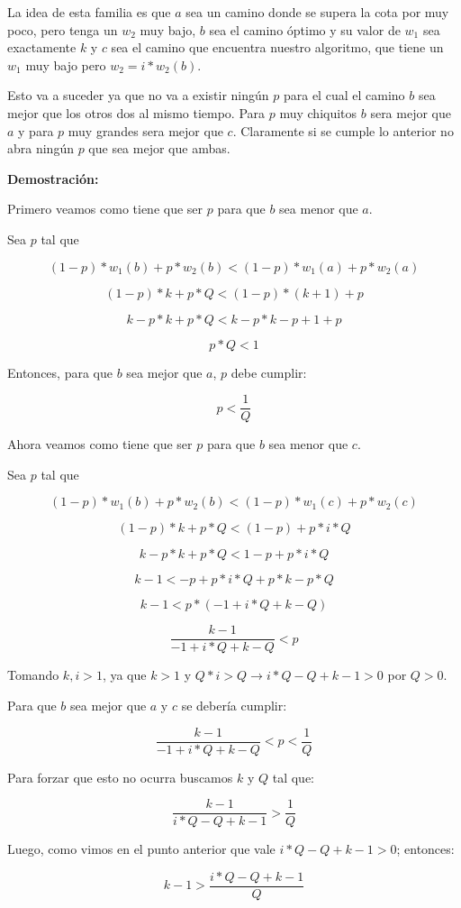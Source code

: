 La idea de esta familia es que $a$ sea un camino donde se supera la cota por muy poco, pero tenga un $w_2$ muy bajo, $b$ sea el camino óptimo y su valor de $w_1$ sea exactamente $k$ y $c$ sea el camino que encuentra nuestro algoritmo, que tiene un $w_1$ muy bajo pero $w_2 = i * w_2(b)$.

Esto va a suceder ya que no va a existir ningún $p$ para el cual el camino $b$ sea mejor que los otros dos al mismo tiempo. Para $p$ muy chiquitos $b$ sera mejor que $a$ y para $p$ muy grandes sera mejor que $c$. Claramente si se cumple lo anterior no abra ningún $p$ que sea mejor que ambas.

\textbf{Demostración:}

Primero veamos como tiene que ser $p$ para que $b$ sea menor que $a$.

Sea $p$ tal que 

$$(1-p)*w_1(b)+p*w_2(b) < (1-p)*w_1(a)+p*w_2(a)$$

$$(1-p)*k+p*Q < (1-p)*(k+1)+p$$

$$k-p*k+p*Q < k-p*k-p+1+p$$

$$p*Q < 1$$

Entonces, para que $b$ sea mejor que $a$, $p$ debe cumplir:

$$p < \frac{1}{Q}$$

Ahora veamos como tiene que ser $p$ para que $b$ sea menor que $c$.

Sea $p$ tal que 

$$(1-p)*w_1(b)+p*w_2(b) < (1-p)*w_1(c)+p*w_2(c)$$

$$(1-p)*k+p*Q < (1-p)+p*i*Q$$

$$k-p*k+p*Q < 1-p+p*i*Q$$

$$k-1 < -p+p*i*Q+p*k-p*Q$$

$$k-1 < p*(-1+i*Q+k-Q)$$

$$\frac{k-1}{-1+i*Q+k-Q} < p$$

Tomando $k,i > 1$, ya que $k > 1$ y $Q*i > Q \rightarrow i*Q-Q+k-1 > 0$ por $Q > 0$.

Para que $b$ sea mejor que $a$ y $c$ se debería cumplir:

$$\frac{k-1}{-1+i*Q+k-Q} < p < \frac{1}{Q}$$

Para forzar que esto no ocurra buscamos $k$ y $Q$ tal que:

$$\frac{k-1}{i*Q-Q+k-1} > \frac{1}{Q}$$

Luego, como vimos en el punto anterior que vale $i*Q-Q+k-1 > 0$; entonces:

$$k-1 > \frac{i*Q-Q+k-1}{Q}$$

